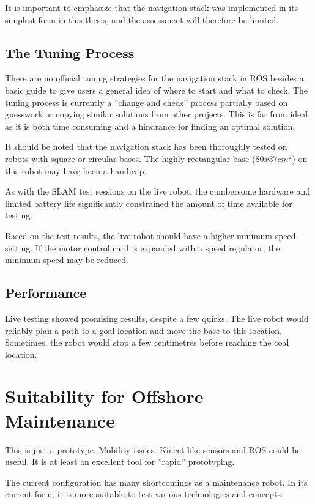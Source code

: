 It is important to emphasize that the navigation stack was implemented in its simplest form in this thesis, and the assessment will therefore be limited. 

\subsection{The Tuning Process}

There are no official tuning strategies for the navigation stack in \ac{ROS} besides a basic guide to give users a general idea of where to start and what to check\cite{ROS_navigation_tuning}. The tuning process is currently a ''change and check'' process partially based on guesswork or copying similar solutions from other projects. This is far from ideal, as it is both time consuming and a hindrance for finding an optimal solution. 

It should be noted that the navigation stack has been thoroughly tested on robots with square or circular bases. The highly rectangular base ($80x37 cm^2$) on this robot may have been a handicap.

As with the \ac{SLAM} test sessions on the live robot, the cumbersome hardware and limited battery life significantly constrained the amount of time available for testing. 

Based on the test results, the live robot should have a higher minimum speed setting. If the motor control card is expanded with a speed regulator, the minimum speed may be reduced.

\subsection{Performance}

Live testing showed promising results, despite a few quirks. The live robot would reliably plan a path to a goal location and move the base to this location. Sometimes, the robot would stop a few centimetres before reaching the coal location.

\section{Suitability for Offshore Maintenance}

This is just a prototype. Mobility issues.
Kinect-like sensors and ROS could be useful. It is at least an excellent tool for ''rapid'' prototyping.

The current configuration has many shortcomings as a maintenance robot. In its current form, it is more suitable to test various technologies and concepts. 

